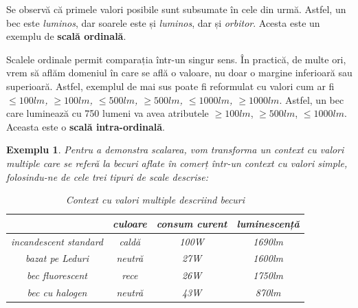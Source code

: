 \documentclass[12pt, a4paper, twoside, romanian]{teza-upb}
\newtheorem{example}{Exemplu}
\begin{document}
    Se observă că primele valori posibile sunt subsumate în cele din urmă. Astfel, un bec este \textit{luminos}, dar soarele este și \textit{luminos}, dar și \textit{orbitor}. Acesta este un exemplu de \textbf{scală ordinală}.

  Scalele ordinale permit comparația într-un singur sens. În practică, de multe ori, vrem să aflăm domeniul în care se află o valoare, nu doar o margine inferioară sau superioară. Astfel, exemplul de mai sus poate fi reformulat cu valori cum ar fi \textit{{$\le 100lm$, $\ge 100lm$, $\le 500 lm$, $\ge 500 lm$, $\le 1000 lm$, $\ge 1000 lm$}}. Astfel, un bec care luminează cu 750 lumeni va avea atributele {$\ge 100 lm$, $\ge 500 lm$, $\le 1000 lm$}. Aceasta este o \textbf{scală intra-ordinală}.


  \begin{example}
  Pentru a demonstra scalarea, vom transforma un context cu valori multiple care se referă la becuri aflate în comerț într-un context cu valori simple, folosindu-ne de cele trei tipuri de scale descrise:
    \begin{table}[h!]
      \begin{tabular}[c]{| c | c | c | c |}\hline
        & culoare & consum curent & luminescență \\ \hline 
          incandescent standard & caldă & 100W & 1690lm \\ \hline
          bazat pe Leduri & neutră & 27W & 1600lm \\ \hline
          bec fluorescent & rece & 26W & 1750lm \\ \hline
          bec cu halogen & neutră & 43W & 870lm \\ \hline
      \end{tabular}
      \caption{Context cu valori multiple descriind becuri}
      \label{table:becuri-multiple}
    \end{table}
  \begin{table}[h!]
    \begin{cxt}
    \end{cxt}
    \label{example:lightbulbs}

    \caption{Același context ca în tabelul \ref{table:becuri-multiple}, dar transformat în context cu valori simple}
  \end{table}
  \end{example}
\end{document}
